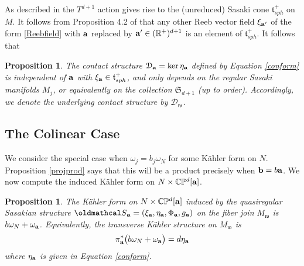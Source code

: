 \documentclass[12pt]{amsart}
\newtheorem{proposition}[theorem]{Proposition}
\def\bbc{{\mathbb C}}
\def\bbp{{\mathbb P}}
\def\bbr{{\mathbb R}}
\def\gro{\omega}
\def\bfa{{\bf a}}
\def\bfb{{\bf b}}
\def\cald{{\mathcal D}}
\def\cals{{\oldmathcal S}}
\def\gt{{\mathfrak t}}
\def\gw{{\mathfrak w}}
\def\gS{{\mathfrak S}}
\begin{document}
As described in \cite{BGS06} the $T^{d+1}$ action gives rise to the (unreduced) Sasaki cone $\gt^+_{sph}$ on $M$. It follows from Proposition 4.2 of \cite{Yam99} that any other Reeb vector field $\xi_{\bfa'}$ of the form \eqref{Reebfield} with $\bfa$ replaced by $\bfa'\in(\bbr^+)^{d+1}$ is an element of $\gt^+_{sph}$. It follows that 

\begin{proposition}\label{construct}
The contact structure $\cald_\bfa=\ker\eta_\bfa$ defined by Equation \eqref{conform} is independent of $\bfa$ with $\xi_\bfa\in\gt^+_{sph}$, and only depends on the regular Sasaki manifolds $M_j$, or equivalently on the collection $\gS_{d+1}$ (up to order). Accordingly, we denote the underlying contact structure by $\cald_\gw$.
\end{proposition}


\subsection{The Colinear Case}
We consider the special case when $\gro_j=b_j\gro_N$ for some K\"ahler form on $N$. Proposition \ref{projprod} says that this will be a product precisely when $\bfb=b\bfa$. We now compute the induced K\"ahler form on $N\times \bbc\bbp^d[\bfa]$.

\begin{proposition}\label{projKahform}
The K\"ahler form on $N\times \bbc\bbp^d[\bfa]$ induced by the quasiregular Sasakian structure $\cals_\bfa=(\xi_\bfa,\eta_\bfa,\Phi_\bfa,g_\bfa)$ on the fiber join $M_\gw$ is $b\gro_N+\gro_\bfa$. Equivalently, the transverse K\"ahler structure on $M_\gw$ is  
\begin{equation}\label{transsymp}
\pi^*_\bfa\bigl(b\gro_N+\gro_\bfa\bigr)=d\eta_\bfa
\end{equation}
where $\eta_\bfa$ is given in Equation \eqref{conform}. 

\end{proposition}
\end{document}
